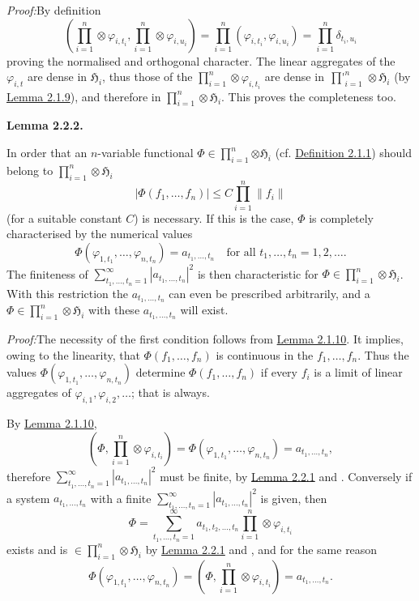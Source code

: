 \documentclass[12pt,b5paper,twoside]{article}
\newcommand{\Hspace}{\mathfrak H}
\newcommand{\Lemma}[1]{%
  \par\smallskip\noindent\phantomsection\label{lem:#1}\textbf{Lemma #1.}\enspace
}
\newcommand{\Proof}{\par\noindent\textit{Proof:}\enspace}
\newcommand{\defref}[1]{\hyperref[def:#1]{Definition #1}}
\newcommand{\lemref}[1]{\hyperref[lem:#1]{Lemma #1}}
\begin{document}
\Proof By definition
\[
 \left(\prod_{i=1}^{n}\otimes\varphi_{i,t_i},
       \prod_{i=1}^{n}\otimes\varphi_{i,u_i}\right)
 =\prod_{i=1}^{n}(\varphi_{i,t_i},\varphi_{i,u_i})
 =\prod_{i=1}^{n}\delta_{t_i,u_i}
\]
proving the normalised and orthogonal character. The linear aggregates of the
$\varphi_{i,t}$ are dense in $\Hspace_i$, thus those of the
$\prod_{i=1}^{n}\otimes\varphi_{i,t_i}$ are dense in
$\mathop{\prod\nolimits'}_{i=1}^{n}\otimes\Hspace_i$ (by \lemref{2.1.9}),
and therefore in $\prod_{i=1}^{n}\otimes\Hspace_i$. This proves the
completeness too.

\Lemma{2.2.2}
In order that an $n$-variable functional
$\Phi\in\prod_{i=1}^{n}\bm{\otimes}\Hspace_i$ (cf. \defref{2.1.1}) should belong to
$\prod_{i=1}^{n}\otimes\Hspace_i$
\[
 |\Phi(f_1,\ldots,f_n)|\leq C\prod_{i=1}^{n}\lVert f_i\rVert
\]
(for a suitable constant $C$) is necessary. If this is the case, $\Phi$ is
completely characterised by the numerical values
\[
 \Phi(\varphi_{1,t_1},\ldots,\varphi_{n,t_n})
   =a_{t_1,\ldots,t_n}\quad\text{for all }t_1,\ldots,t_n=1,2,\ldots.
\]
The finiteness of
$\sum_{t_1,\ldots,t_n=1}^{\infty}|a_{t_1,\ldots,t_n}|^2$ is then
characteristic for $\Phi\in\prod_{i=1}^{n}\otimes\Hspace_i$. With this
restriction the $a_{t_1,\ldots,t_n}$ can even be prescribed arbitrarily, and
a $\Phi\in\prod_{i=1}^{n}\otimes\Hspace_i$ with these
$a_{t_1,\ldots,t_n}$ will exist.

\Proof The necessity of the first condition follows from \lemref{2.1.10}. It
implies, owing to the linearity, that $\Phi(f_1,\ldots,f_n)$ is continuous in
the $f_1,\ldots,f_n$. Thus the values
$\Phi(\varphi_{1,t_1},\ldots,\varphi_{n,t_n})$ determine
$\Phi(f_1,\ldots,f_n)$ if every $f_i$ is a limit of linear aggregates of
$\varphi_{i,1},\varphi_{i,2},\ldots$; that is always.

By \lemref{2.1.10},
\[
 \left(\Phi,\prod_{i=1}^{n}\otimes\varphi_{i,t_i}\right)
 =\Phi(\varphi_{1,t_1},\ldots,\varphi_{n,t_n})=a_{t_1,\ldots,t_n},
\]
therefore
$\sum_{t_1,\ldots,t_n=1}^{\infty}|a_{t_1,\ldots,t_n}|^2$ must be finite, by
\lemref{2.2.1} and \cite[p.~66]{ref16}. Conversely if a system
$a_{t_1,\ldots,t_n}$ with a finite
$\sum_{t_1,\ldots,t_n=1}^{\infty}|a_{t_1,\ldots,t_n}|^2$ is given, then
\[
 \Phi=\sum_{t_1,\ldots,t_n=1}^{\infty}a_{t_1,t_2,\ldots,t_n}
       \prod_{i=1}^{n}\otimes\varphi_{i,t_i}
\]
exists and is $\in\prod_{i=1}^{n}\otimes\Hspace_i$ by \lemref{2.2.1} and
\cite[p.~67]{ref16}, and for the same reason
\[
 \Phi(\varphi_{1,t_1},\ldots,\varphi_{n,t_n})
 =\left(\Phi,\prod_{i=1}^{n}\otimes\varphi_{i,t_i}\right)
 =a_{t_1,\ldots,t_n}.
\]
\end{document}
